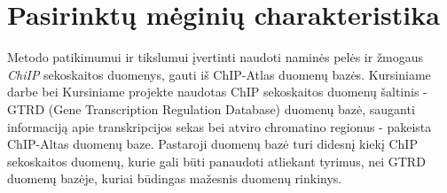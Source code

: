 \documentclass[12pt]{article}
\begin{document}


\newpage


\section{Pasirinktų mėginių charakteristika}
Metodo patikimumui ir tikslumui įvertinti naudoti naminės pelės ir žmogaus
\emph{ChiIP} sekoskaitos duomenys, gauti iš ChIP-Atlas duomenų bazės.
Kursiniame darbe bei Kursiniame projekte naudotas ChIP sekoskaitos duomenų
šaltinis - GTRD (Gene Transcription Regulation Database)\cite{GTRD} duomenų
bazė, sauganti informaciją apie transkripcijos sekas bei atviro chromatino
regionus - pakeista ChIP-Altas\cite{CHIPATLAS} duomenų baze. Pastaroji duomenų
bazė turi didesnį kiekį ChIP sekoskaitos duomenų, kurie gali būti panaudoti
atliekant tyrimus, nei GTRD duomenų bazėje, kuriai būdingas mažesnis duomenų
rinkinys.
\end{document}

